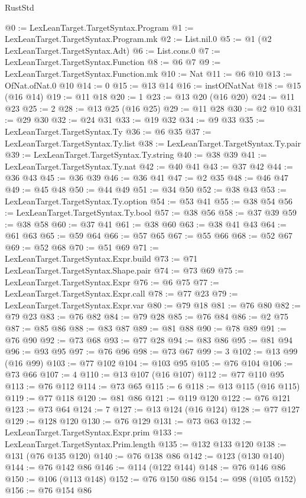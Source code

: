 \begin{lexlean}{RustStd}
\begin{coremodule}
{\begin{coremodule}
{{{{{{{{{{{{{{{@0 := LexLeanTarget.TargetSyntax.Program
@1 := LexLeanTarget.TargetSyntax.Program.mk
@2 := List.nil.{0}
@5 := @1 (@2 LexLeanTarget.TargetSyntax.Adt)
@6 := List.cons.{0}
@7 := LexLeanTarget.TargetSyntax.Function
@8 := @6 @7
@9 := LexLeanTarget.TargetSyntax.Function.mk
@10 := Nat
@11 := @6 @10
@13 := OfNat.ofNat.{0} @10
@14 := 0
@15 := @13 @14
@16 := instOfNatNat
@18 := @15 (@16 @14)
@19 := @11 @18
@20 := 1
@23 := @13 @20 (@16 @20)
@24 := @11 @23
@25 := 2
@28 := @13 @25 (@16 @25)
@29 := @11 @28
@30 := @2 @10
@31 := @29 @30
@32 := @24 @31
@33 := @19 @32
@34 := @9 @33
@35 := LexLeanTarget.TargetSyntax.Ty
@36 := @6 @35
@37 := LexLeanTarget.TargetSyntax.Ty.list
@38 := LexLeanTarget.TargetSyntax.Ty.pair
@39 := LexLeanTarget.TargetSyntax.Ty.string
@40 := @38 @39
@41 := LexLeanTarget.TargetSyntax.Ty.nat
@42 := @40 @41
@43 := @37 @42
@44 := @36 @43
@45 := @36 @39
@46 := @36 @41
@47 := @2 @35
@48 := @46 @47
@49 := @45 @48
@50 := @44 @49
@51 := @34 @50
@52 := @38 @43
@53 := LexLeanTarget.TargetSyntax.Ty.option
@54 := @53 @41
@55 := @38 @54
@56 := LexLeanTarget.TargetSyntax.Ty.bool
@57 := @38 @56
@58 := @37 @39
@59 := @38 @58
@60 := @37 @41
@61 := @38 @60
@63 := @38 @41 @43
@64 := @61 @63
@65 := @59 @64
@66 := @57 @65
@67 := @55 @66
@68 := @52 @67
@69 := @52 @68
@70 := @51 @69
@71 := LexLeanTarget.TargetSyntax.Expr.build
@73 := @71 LexLeanTarget.TargetSyntax.Shape.pair
@74 := @73 @69
@75 := LexLeanTarget.TargetSyntax.Expr
@76 := @6 @75
@77 := LexLeanTarget.TargetSyntax.Expr.call
@78 := @77 @23
@79 := LexLeanTarget.TargetSyntax.Expr.var
@80 := @79 @18
@81 := @76 @80
@82 := @79 @23
@83 := @76 @82
@84 := @79 @28
@85 := @76 @84
@86 := @2 @75
@87 := @85 @86
@88 := @83 @87
@89 := @81 @88
@90 := @78 @89
@91 := @76 @90
@92 := @73 @68
@93 := @77 @28
@94 := @83 @86
@95 := @81 @94
@96 := @93 @95
@97 := @76 @96
@98 := @73 @67
@99 := 3
@102 := @13 @99 (@16 @99)
@103 := @77 @102
@104 := @103 @95
@105 := @76 @104
@106 := @73 @66
@107 := 4
@110 := @13 @107 (@16 @107)
@112 := @77 @110 @95
@113 := @76 @112
@114 := @73 @65
@115 := 6
@118 := @13 @115 (@16 @115)
@119 := @77 @118
@120 := @81 @86
@121 := @119 @120
@122 := @76 @121
@123 := @73 @64
@124 := 7
@127 := @13 @124 (@16 @124)
@128 := @77 @127
@129 := @128 @120
@130 := @76 @129
@131 := @73 @63
@132 := LexLeanTarget.TargetSyntax.Expr.prim
@133 := LexLeanTarget.TargetSyntax.Prim.length
@135 := @132 @133 @120
@138 := @131 (@76 @135 @120)
@140 := @76 @138 @86
@142 := @123 (@130 @140)
@144 := @76 @142 @86
@146 := @114 (@122 @144)
@148 := @76 @146 @86
@150 := @106 (@113 @148)
@152 := @76 @150 @86
@154 := @98 (@105 @152)
@156 := @76 @154 @86
}}}}}}}}}}}}}}}
\end{coremodule}}
\end{coremodule}
\end{lexlean}
